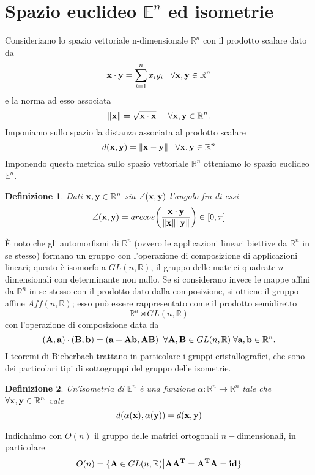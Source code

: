 \documentclass[a4paper,11pt,openright,twoside	]{book}
\newtheorem{definition}{Definizione}[section]
\begin{document}
\section{Spazio euclideo $\mathbb{E}^n$ ed isometrie}
Consideriamo lo spazio vettoriale n-dimensionale $\mathbb{R}^{n}$  con il prodotto scalare dato da 
\[
  \vb{x} \cdot \vb{y} =  \sum_{i=1}^{n} x_i y_i    \; \; \; \forall \vb{x} , \vb{y} \in \mathbb{R}^{n}
\]
e la norma ad esso associata              
\[
  \norm{\vb{x}} =  \sqrt{\vb{x} \cdot \vb{x}}     \; \; \; \; \; \forall \vb{x} , \vb{y} \in \mathbb{R}^{n}.
\]
Imponiamo sullo spazio la distanza associata al prodotto scalare 
\[ d(\vb{x}, \vb{y} ) = \norm{\vb{x-y}}           \; \; \; \forall \vb{x} , \vb{y} \in \mathbb{R}^{n}\] 
Imponendo questa metrica sullo spazio vettoriale $\mathbb{R}^n$ otteniamo lo spazio euclideo $\mathbb{E}^n$. 
\begin{definition}
Dati $\vb{x, y} \in \mathbb{R}^n$  sia $\angle (\vb{x},\vb{y})$ l'angolo fra di essi
\[ \angle (\vb{x},\vb{y}) = arccos \bigg( \frac{\vb{x} \cdot \vb{y}}{\norm{\vb{x}} \norm{\vb{y}}} \bigg) \in [0, \pi] \]
\end{definition} 
\`E noto che gli automorfismi di $\mathbb{R}^n$ (ovvero le applicazioni lineari biettive da $\mathbb{R}^n$ in se stesso) formano un gruppo con l'operazione di composizione di applicazioni lineari; questo è isomorfo a $ GL(n, \mathbb{R}) $, il gruppo delle matrici quadrate $n-$dimensionali con determinante non nullo. 
Se si considerano invece le mappe affini da $\mathbb{R}^n$ in se stesso con il prodotto dato dalla composizione, si ottiene il gruppo affine $Aff(n, \mathbb{R})$; esso può essere rappresentato come il prodotto semidiretto 
\[  \mathbb{R}^{n} \rtimes GL(n, \mathbb{R})   \]
con l'operazione di composizione data da 
\[ (\vb{A, a}) \cdot (\vb{B, b}) = (\vb{ a + Ab, AB})  \; \; \forall \vb{A, B}  \in  GL(n, \mathbb{R}) \; \forall \vb{a, b} \in \mathbb{R}^n. \]
I teoremi di Bieberbach trattano in particolare i gruppi cristallografici, che sono dei particolari tipi di sottogruppi del gruppo delle isometrie.
\begin{definition}
	Un'isometria di $\mathbb{E}^n$  è una funzione $ \alpha : \mathbb{R}^{n} \longrightarrow \mathbb{R}^{n} $  tale che $\forall \vb{x,y} \in \mathbb{R}^n $ vale 
	\[ d(\alpha(\vb{x}), \alpha(\vb{y})) = d(\vb{x} , \vb{y} )\]
\end{definition} 
Indichaimo con $O(n)$ il gruppo delle matrici ortogonali $n-$dimensionali, in particolare 
\[ O(n) = \{ \vb{A} \in GL(n, \mathbb{R}) \big| \vb{A A^{T}} = \vb{A^{T} A} = \vb{id} \}\]
\end{document}
